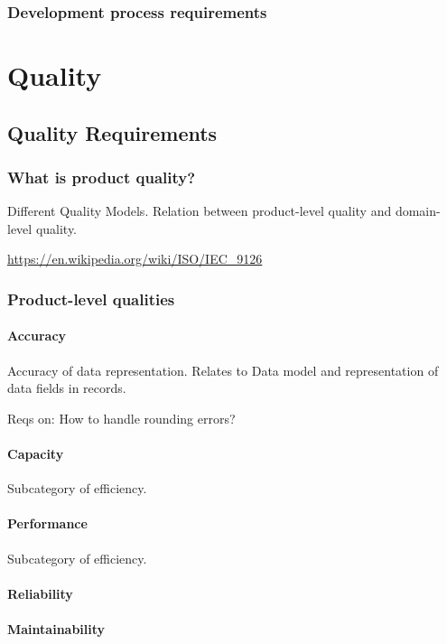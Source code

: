 \documentclass{reqengbook}
\begin{document}
\section{Development process requirements}


\part{Quality} %


\chapter{Quality Requirements}
\section{What is product quality?}
Different Quality Models. Relation between product-level quality and domain-level quality.

\url{https://en.wikipedia.org/wiki/ISO/IEC_9126}

\section{Product-level qualities}
\subsection{Accuracy}

Accuracy of data representation. Relates to Data model and  representation of data fields in records.

Reqs on: How to handle rounding errors?

\subsection{Capacity}
Subcategory of efficiency.

\subsection{Performance}
Subcategory of efficiency.

\subsection{Reliability}

\subsection{Maintainability}
\end{document}
